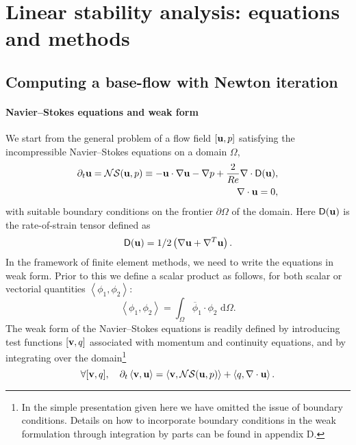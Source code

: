 \documentclass[twocolumn,10pt]{asme2ej}
\newcommand{\be}[1]{ \begin{equation} \label{#1}}
\newcommand{\ee}{\end{equation}}
\begin{document}

\section{Linear stability analysis: equations and methods}
\vspace{.2cm}

\subsection{Computing a base-flow with Newton iteration}
\vspace{.2cm}

\paragraph{Navier--Stokes equations and weak form}

We start from the general problem of a flow field $[{\bf u},p]$ satisfying the incompressible Navier--Stokes equations on a domain $\Omega$,
\begin{eqnarray} \label{NSprimitive}
\partial_t {\bf u} = {\cal NS} ({\bf u},p)
\equiv - {\bf u} \cdot \nabla {\bf u} - \nabla p + \frac{2}{Re}  \nabla \cdot {\mathsf{D}}({\bf u}),  \\
\nabla \cdot {\bf u} = 0,
\end{eqnarray}
with suitable boundary conditions on the frontier $\partial \Omega$ of the domain.
Here $ {\mathsf{D}}({\bf u}) $ is the rate-of-strain tensor defined as
$$
 {\mathsf{D}}({\bf u}) = 1/2
\left( \nabla {\bf u} +  \nabla^T  {\bf u}\right).
$$ 
In the framework of finite element methods, we need to write the equations in weak form.
Prior to this we define a scalar product as follows, for both scalar or vectorial quantities 
$\left< \phi_1, \phi_2 \right> $:
$$
\left< \phi_1, \phi_2 \right> = \int_\Omega \overline{\phi}_1 \cdot \phi_2   \mbox{ d} \Omega.
$$
The weak form of the Navier--Stokes equations is readily defined by introducing test functions 
$[{\bf v},q]$ associated with momentum and continuity equations, and by integrating over the domain\footnote{In the simple presentation given here we have omitted the issue of boundary conditions. Details on how to incorporate boundary conditions in the weak formulation through integration by parts can be found in appendix D.}
\be{NSweak}
\forall [{\bf v},q], \quad \partial_t \left< {\bf v}, {\bf u}\right> = \left< {\bf v} , {\cal NS} ({\bf u},p) \right> + \left< q, \nabla \cdot {\bf u}\right>.
\ee
\end{document}
